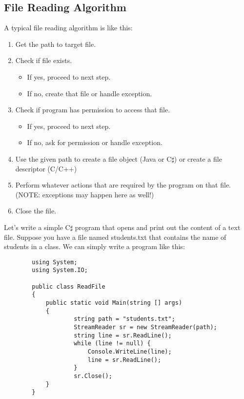 \documentclass[../main.tex]{subfiles}
\begin{document}
\subsection{File Reading Algorithm}
A typical file reading algorithm is like this:
    \begin{enumerate}
        \item Get the path to target file.
        \item Check if file exists.
            \begin {itemize}
                \item If yes, proceed to next step.
                \item If no, create that file or handle exception.
            \end {itemize}
        \item Check if program has permission to access that file.
            \begin {itemize}
                \item If yes, proceed to next step.
                \item If no, ask for permission or handle exception.
            \end{itemize}
        \item Use the given path to create a file object (Java or C$\sharp$) or
        create a file descriptor (C/C++)
        \item Perform whatever actions that are required by the program on that file.
        (NOTE: exceptions may happen here as well!)
        \item Close the file.
    \end{enumerate}

    Let's write a simple C$\sharp$ program that opens and print out the content of a
    text file. Suppose you have a file named students.txt that contains the name of
    students in a class. We can simply write a program like this:

    \begin{verbatim}
        using System;
        using System.IO;

        public class ReadFile
        {
            public static void Main(string [] args)
            {
                    string path = "students.txt";
                    StreamReader sr = new StreamReader(path);
                    string line = sr.ReadLine();
                    while (line != null) {
                        Console.WriteLine(line);
                        line = sr.ReadLine();
                    }
                    sr.Close();
            }
        }
    \end{verbatim}
\end{document}
